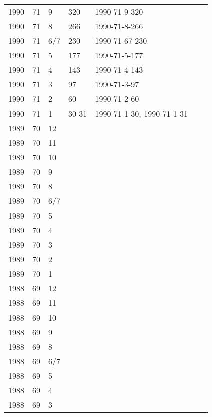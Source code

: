 \begin{longtable}{ |l|l|l|l|p{2.7cm}|l|p{2cm}| }
 1990 & 71 &     9 &    320  & 1990-71-9-320  &  & \\
 1990 & 71 &     8 &    266  & 1990-71-8-266  &  & \\
 1990 & 71 &   6/7 &    230  & 1990-71-67-230 &  & \\
 1990 & 71 &     5 &    177  & 1990-71-5-177  &   & \\
 1990 & 71 &     4 &    143  & 1990-71-4-143  &  & \\
 1990 & 71 &     3 &   97    & 1990-71-3-97   &  & \\
 1990 & 71 &     2 &  60     & 1990-71-2-60   &  & \\
 1990 & 71 &     1 &  30-31  & 1990-71-1-30, 1990-71-1-31               &  & \\
 1989 & 70 &    12 &         &                &   & \\
 1989 & 70 &    11 &         &                &  & \\
 1989 & 70 &    10 &         &                &  & \\
 1989 & 70 &     9 &         &                &  & \\
 1989 & 70 &     8 &         &                &  & \\
 1989 & 70 &   6/7 &         &                &  & \\
 1989 & 70 &     5 &         &                &  & \\
 1989 & 70 &     4 &         &                &  & \\
 1989 & 70 &     3 &         &                &  & \\
 1989 & 70 &     2 &         &                &  & \\
 1989 & 70 &     1 &         &                &  & \\
 1988 & 69 &    12 &         &                &  & \\
 1988 & 69 &    11 &         &                &  & \\
 1988 & 69 &    10 &         &                &  & \\
 1988 & 69 &     9 &         &                &  & \\
 1988 & 69 &     8 &         &                &  & \\
 1988 & 69 &   6/7 &         &                &  & \\
 1988 & 69 &     5 &         &                &  & \\
 1988 & 69 &     4 &         &                &  & \\
 1988 & 69 &     3 &         &                &  & \\

\end{longtable}
